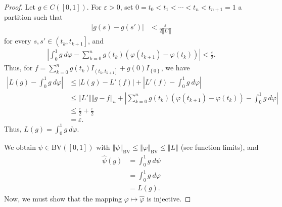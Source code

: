 \documentclass[10pt]{extarticle}
\newcommand{\norm}[1]{\left\Vert #1\right\Vert}
\newcommand{\set}[1]{\left\{#1\right\}}
\newcommand{\ve}{\varepsilon}
\theoremstyle{plain}
\theoremstyle{definition}
\theoremstyle{note}
\renewcommand{\newline}{\hfill\break}
\begin{document}
\begin{proof}
  Let $g \in C\left([0,1]\right)$. For $\ve > 0$, set $0 = t_0 < t_1 < \cdots < t_{n} < t_{n+1} = 1$ a partition such that
  \begin{align*}
    \left\vert g(s) - g(s') \right\vert &< \frac{\ve}{2\norm{L'}}
  \end{align*}
  for every $s,s'\in \left(t_{k},t_{k+1}\right]$, and
  \begin{align*}
    \left\vert \int_{0}^{1} g\:d\varphi - \sum_{k=0}^{n}g(t_k)\left(\varphi\left(t_{k+1}\right)-\varphi\left(t_{k}\right)\right) \right\vert < \frac{\ve}{2}.
  \end{align*}
  Thus, for $f = \sum_{k=0}^{n}g(t_k)I_{\left(t_{k},t_{k+1}\right]} + g(0)I_{\set{0}}$, we have
  \begin{align*}
    \left\vert L(g) - \int_{0}^{1} g\:d\varphi \right\vert &\leq \left\vert L(g) - L'(f) \right\vert + \left\vert L'(f) - \int_{0}^{1} g\:d\varphi \right\vert\\
                                                           &\leq \norm{L'}\norm{g - f}_{u} + \left\vert \sum_{k=0}^{n}g(t_k)\left(\varphi\left(t_{k+1}\right)- \varphi\left(t_k\right)\right) - \int_{0}^{1} g\:d\varphi \right\vert\\
                                                           &\leq \frac{\ve}{2} + \frac{\ve}{2}\\
                                                           &= \ve.
  \end{align*}
  Thus, $L(g) = \int_{0}^{1} g\:d\varphi$.\newline

  We obtain $\psi \in \text{BV}\left([0,1]\right)$ with $\norm{\psi}_{\text{BV}} \leq \norm{\varphi}_{\text{BV}}\leq \norm{L}$ (see function limits), and
  \begin{align*}
    \hat{\psi}(g) &= \int_{0}^{1} g\:d\psi\\
                  &= \int_{0}^{1} g\:d\varphi\\
                  &= L(g).
  \end{align*}
  Now, we must show that the mapping $\varphi \mapsto \hat\varphi$ is injective.\newline


\end{proof}
\end{document}
